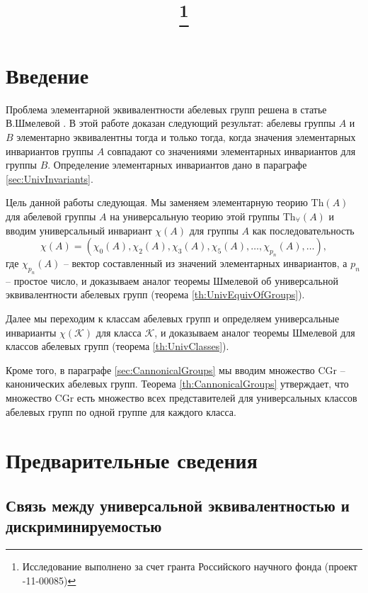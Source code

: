 \documentclass[a4paper,11pt,twoside]{article}
\title{\titles\footnote{Исследование выполнено за счет гранта Российского научного фонда (проект \No 14-11-00085)}}
\author{\authors}
\gdef\firstpage{1}
\def\K{{\mathcal{K}}}
\def\Th{{\mathrm{Th}}}
\def\Tha{{\mathrm{Th}_\forall}}
\def\CG{{\mathrm{CGr}}}
\begin{document}
\maketitle

\tableofcontents


\setcounter{page}{\firstpage}
\pagestyle{newpstyle}

\Russian
\sloppy
\rm

\section{Введение}

Проблема элементарной эквивалентности абелевых групп решена в статье В.Шмелевой \cite{Szm}. В этой работе доказан следующий результат: абелевы группы $A$ и $B$ элементарно эквивалентны тогда и только тогда, когда значения элементарных инвариантов группы $A$ совпадают со значениями элементарных инвариантов для группы $B$. Определение элементарных инвариантов дано в параграфе \ref{sec:UnivInvariants}.

Цель данной работы следующая. Мы заменяем элементарную теорию $\Th(A)$ для абелевой группы $A$ на универсальную теорию этой группы $\Tha(A)$ и вводим универсальный инвариант $\chi(A)$ для группы $A$ как последовательность 
$$\chi(A) = (\chi_0(A), \chi_2(A), \chi_3(A), \chi_5(A), \ldots, \chi_{p_n}(A), \ldots ),$$
где $\chi_{p_n}(A)$ -- вектор составленный из значений элементарных инвариантов, а $p_n$ -- простое число, и доказываем аналог теоремы Шмелевой об универсальной эквивалентности абелевых групп (теорема \ref{th:UnivEquivOfGroups}).

Далее мы переходим к классам абелевых групп и определяем универсальные инварианты $\chi(\K)$ для класса $\K$, и доказываем аналог теоремы Шмелевой для классов абелевых групп (теорема \ref{th:UnivClasses}).

Кроме того, в параграфе \ref{sec:CannonicalGroups} мы вводим множество $\CG$ -- канонических абелевых групп. Теорема \ref{th:CannonicalGroups} утверждает, что множество $\CG$ есть множество всех представителей для универсальных классов абелевых групп по одной группе для каждого класса. 

\section{Предварительные сведения}

\subsection{Связь между универсальной эквивалентностью и дискриминируемостью}
\end{document}
